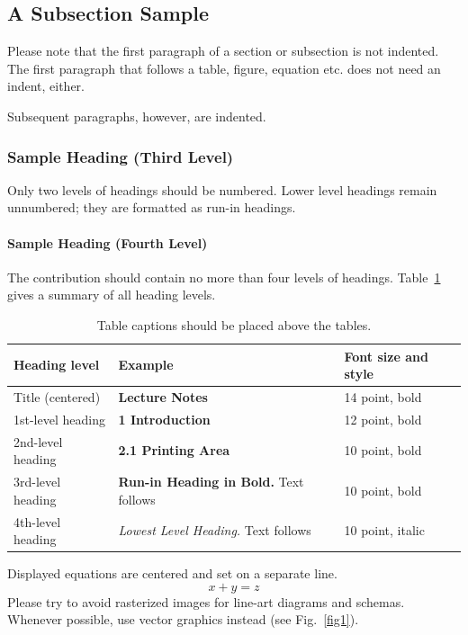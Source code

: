 \documentclass[runningheads]{llncs}
\begin{document}
\subsection{A Subsection Sample}
Please note that the first paragraph of a section or subsection is
not indented. The first paragraph that follows a table, figure,
equation etc. does not need an indent, either.

Subsequent paragraphs, however, are indented.

\subsubsection{Sample Heading (Third Level)} Only two levels of
headings should be numbered. Lower level headings remain unnumbered;
they are formatted as run-in headings.

\paragraph{Sample Heading (Fourth Level)}
The contribution should contain no more than four levels of
headings. Table~\ref{tab1} gives a summary of all heading levels.

\begin{table}
\caption{Table captions should be placed above the
tables.}\label{tab1}
\begin{tabular}{|l|l|l|}
\hline
Heading level &  Example & Font size and style\\
\hline
Title (centered) &  {\Large\bfseries Lecture Notes} & 14 point, bold\\
1st-level heading &  {\large\bfseries 1 Introduction} & 12 point, bold\\
2nd-level heading & {\bfseries 2.1 Printing Area} & 10 point, bold\\
3rd-level heading & {\bfseries Run-in Heading in Bold.} Text follows & 10 point, bold\\
4th-level heading & {\itshape Lowest Level Heading.} Text follows & 10 point, italic\\
\hline
\end{tabular}
\end{table}


\noindent Displayed equations are centered and set on a separate
line.
\begin{equation}
x + y = z
\end{equation}
Please try to avoid rasterized images for line-art diagrams and
schemas. Whenever possible, use vector graphics instead (see
Fig.~\ref{fig1}).
\end{document}
